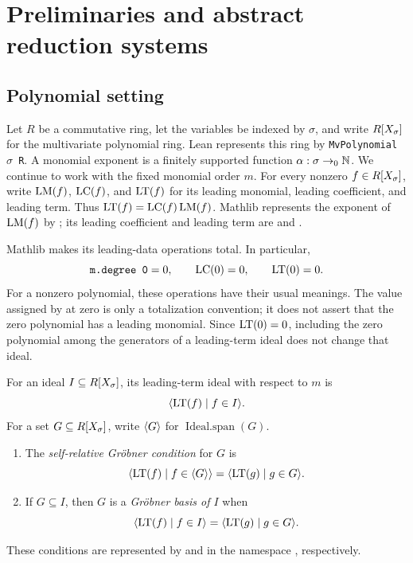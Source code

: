 \section{Preliminaries and abstract reduction systems}\label{sec:setting}

\subsection{Polynomial setting}

Let $R$ be a commutative ring, let the variables be indexed by $\sigma$, and write $R[X_\sigma]$ for the multivariate polynomial ring.  
Lean represents this ring by \texttt{MvPolynomial }\(\sigma\)\texttt{ R}.  
A monomial exponent is a finitely supported function $\alpha:\sigma\to_0\mathbb{N}$.  
We continue to work with the fixed monomial order $m$.  For every nonzero $f\in R[X_\sigma]$, write $\operatorname{LM}(f)$, $\operatorname{LC}(f)$, and $\operatorname{LT}(f)$
for its leading monomial, leading coefficient, and leading term.  Thus
$\operatorname{LT}(f)=\operatorname{LC}(f)\operatorname{LM}(f)$.  Mathlib represents the exponent of $\operatorname{LM}(f)$ by
; its leading coefficient and leading term are
 and .

\begin{remark}
\label{rem:zero-polynomial}
Mathlib makes its leading-data operations total.  In particular,
\[
  \texttt{m.degree 0}=0,\qquad \operatorname{LC}(0)=0,\qquad \operatorname{LT}(0)=0.
\]
For a nonzero polynomial, these operations have their usual meanings.  The
value assigned by  at zero is only a totalization convention;
it does not assert that the zero polynomial has a leading monomial.  Since
$\operatorname{LT}(0)=0$, including the zero polynomial among the generators of a
leading-term ideal does not change that ideal.
\end{remark}

\begin{definition}
\label{def:groebner-conditions}
For an ideal $I\subseteq R[X_\sigma]$, its leading-term ideal with respect to $m$ is
\[
  \langle \operatorname{LT}(f)\mid f\in I \rangle.
\]
For a set $G\subseteq R[X_\sigma]$, write $\langle G \rangle$ for
$\operatorname{Ideal.span}(G)$.
\begin{enumerate}[label=(\roman*),leftmargin=2em]
  \item The \emph{self-relative Gr\"obner condition} for $G$ is
  \[
    \langle \operatorname{LT}(f)\mid f\in\langle G \rangle \rangle
    =\langle \operatorname{LT}(g)\mid g\in G \rangle.
  \]
  \item If $G\subseteq I$, then $G$ is a \emph{Gr\"obner basis of $I$} when
  \[
    \langle \operatorname{LT}(f)\mid f\in I \rangle
    =\langle \operatorname{LT}(g)\mid g\in G \rangle.
  \]
\end{enumerate}
These conditions are represented by  and
 in the namespace , respectively.
\end{definition}

